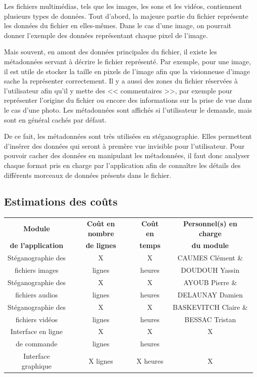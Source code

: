 \documentclass[11pt]{article}
\begin{document}
Les fichiers multimédias, tels que les images, les sons et les vidéos,
contiennent plusieurs types de données. Tout d'abord, la majeure partie du
fichier représente les données du fichier en elles-mêmes. Dans le cas d'une
image, on pourrait donner l'exemple des données représentant chaque pixel de
l'image. 

Mais souvent, en amont des données principales du fichier, il existe les
métadonnées servant à décrire le fichier représenté. Par exemple, pour une
image, il est utile de stocker la taille en pixels de l'image afin que la
visionneuse d'image sache la représenter correctement. Il y a aussi des zones du
fichier réservées à l'utilisateur afin qu'il y mette des << commentaires >>, par
exemple pour représenter l'origine du fichier ou encore des informations sur la
prise de vue dans le cas d'une photo. Les métadonnées sont affichés si
l'utilisateur le demande, mais sont en général cachés par défaut.

De ce fait, les métadonnées sont très utilisées en stéganographie. Elles
permettent d'insérer des données qui seront à premère vue invisible pour
l'utilisateur. Pour pouvoir cacher des données en manipulant les métadonnées,
il faut donc analyser chaque format pris en charge par l'application afin de
connaître les détails des différents morceaux de données présents dans le
fichier. 

\subsection{Estimations des coûts}
\begin{tabular}{|c|c|c|c|}
  \hline
  \textbf{Module} & \textbf{Coût en nombre} & \textbf{Coût en} & \textbf{Personnel(s) en charge} \\
   \textbf{de l'application} & \textbf{de lignes} & \textbf{temps} & \textbf{du module} \\
  \hline
  Stéganographie des & X & X & CAUMES Clément \& \\
   fichiers images & lignes & heures & DOUDOUH Yassin \\
  \hline
  Stéganographie des & X & X & AYOUB Pierre \& \\
   fichiers audios & lignes & heures & DELAUNAY Damien \\
  \hline
  Stéganographie des & X & X & BASKEVITCH Claire \& \\
   fichiers vidéos & lignes & heures & BESSAC Tristan \\
  \hline
    Interface en ligne & X & X & X \\ 
    de commande & lignes & heures & \\
  \hline
  Interface graphique & X lignes & X heures & X \\
  \hline
\end{tabular}
\end{document}

